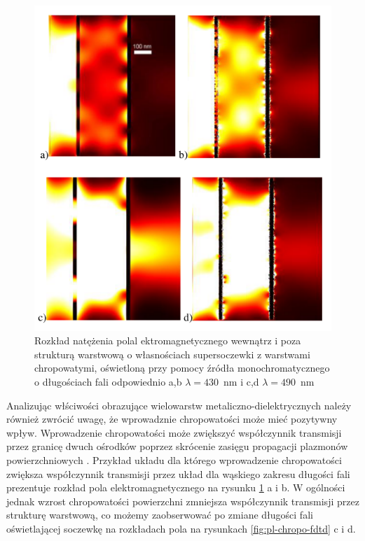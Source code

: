 \begin{figure}[!hbt]
	\begin{center}
	\includegraphics[width=.9\textwidth]{images/multilayer/plp-chropo.png}
	\end{center}
	\caption{Rozkład natężenia polal ektromagnetycznego wewnątrz i poza strukturą warstwową o własnościach supersoczewki z warstwami chropowatymi, oświetloną przy pomocy źródła monochromatycznego o długościach fali odpowiednio a,b $\lambda=430$~nm  i  c,d $\lambda=490$~nm~\cite{Stolarek_2013}}
	\label{fig:plp-chropo-fdtd}
\end{figure}


Analizując włściwości obrazujące wielowarstw metaliczno-dielektrycznych należy również zwrócić uwagę, że wprowadznie chropowatości może mieć pozytywny wpływ. Wprowadzenie chropowatości może zwiększyć współczynnik transmisji przez granicę dwuch ośrodków poprzez skrócenie zasięgu propagacji plazmonów powierzchniowych \cite{huang2012subwavelength}. Przykład układu dla którego wprowadzenie chropowatości zwiększa współczynnik transmisji przez układ dla wąskiego zakresu długości fali prezentuje rozkład pola elektromagnetycznego na rysunku \ref{fig:plp-chropo-fdtd} a i b. W ogólności jednak wzrost chropowatości powierzchni zmniejsza współczynnik transmisji przez strukturę warstwową, co możemy zaobserwować po zmiane długości fali oświetlającej soczewkę na rozkładach pola na rysunkach \ref{fig:pl-chropo-fdtd} c i d. 

